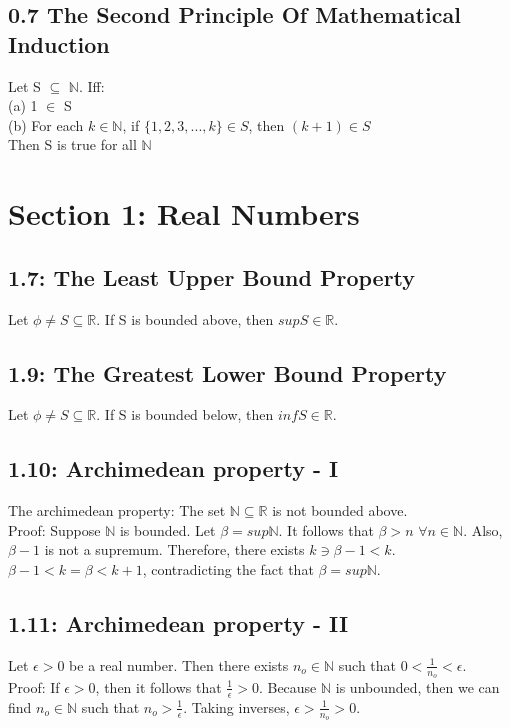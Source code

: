 \documentclass[10pt,letter]{report}
\begin{document}
\section*{0.7 The Second Principle Of Mathematical Induction}
Let S $\subseteq$ $\mathbb{N}$. Iff:\\
(a) 1 $\in$ S\\
(b) For each $k \in \mathbb{N}$, if $\{1, 2, 3, ..., k\} \in S$, then $(k+1) \in S$ \\
Then S is true for all $\mathbb{N}$


\chapter*{Section 1: Real Numbers}

\section*{1.7: The Least Upper Bound Property}
Let $\phi\neq S \subseteq \mathbb{R}$. If S is bounded above, then $sup S \in \mathbb{R}$. 

\section*{1.9: The Greatest Lower Bound Property}
Let $\phi\neq S \subseteq \mathbb{R}$. If S is bounded below, then $inf S \in \mathbb{R}$. 

\section*{1.10: Archimedean property - I}
The archimedean property: The set $\mathbb{N} \subseteq \mathbb{R}$ is not bounded above. \\ 
Proof: Suppose $\mathbb{N}$ is bounded. Let $\beta = sup\mathbb{N}$. It follows that $\beta > n$  $\forall n\in\mathbb{N}$. Also, $\beta - 1$ is not a supremum. Therefore, there exists $k \ni \beta-1 < k$. $\beta - 1 < k = \beta < k+1$, contradicting the fact that $\beta = sup\mathbb{N}$. 

\section*{1.11: Archimedean property - II}
Let $\epsilon > 0$ be a real number. Then there exists $n_o \in \mathbb{N}$ such that $0 < \frac{1}{n_o} < \epsilon$.\\ 
Proof: If $\epsilon > 0$, then it follows that $\frac{1}{\epsilon} > 0$. Because $\mathbb{N}$ is unbounded, then we can find $n_o \in \mathbb{N}$ such that $n_o > \frac{1}{\epsilon}$. Taking inverses, $\epsilon > \frac{1}{n_o} > 0$.
\end{document}
